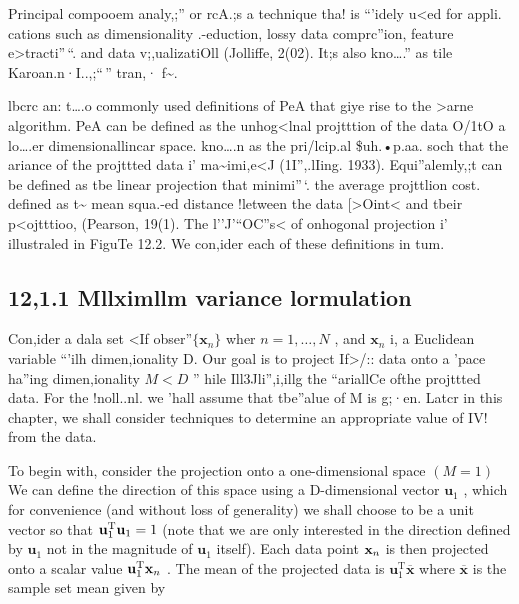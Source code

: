 \documentclass[
  10
]{article}
\begin{document}
Principal compooem analy,;'' or rcA.;s a technique tha! is ``'idely
u\textless ed for appli. cations such as dimensionality .-eduction,
lossy data comprc''ion, feature e\textgreater tracti''\,``. and data
v;,ualizatiOll (Jolliffe, 2(02). It;s also kno\ldots.'' as tile
Karoan.n·I..,;``\,'' tran,· f\textasciitilde.

lbcrc an: t\ldots.o commonly used definitions of PeA that giye rise to
the \textgreater arne algorithm. PeA can be defined as the
unhog\textless lnal projtttion of the data O/1tO a lo\ldots.er
dimensionallincar space. kno\ldots.n as the pri/lcip.al \$uh.•p.aa. soch
that the \textquotesingle ariance of the projttted data i'
ma\textasciitilde imi,e\textless J (1I'',.lIing. 1933). Equi''alemly,;t
can be defined as tbe linear projection that minimi''\,`. the average
projttlion cost. defined as t\textasciitilde{} mean squa.-ed distance
!letween the data {[}\textgreater Oint\textless{} and tbeir
p\textless ojtttioo, (Pearson, 19(1). The l''J'``OC''s\textless{} of
onhogonal projection i' illustraled in FiguTe 12.2. We con,ider each of
these definitions in tum.

\subsection{12,1.1 Mllximllm variance
lormulation}\label{mllximllm-variance-lormulation}

Con,ider a dala set \textless If
obser''\lations \(\{ \mathbf { x } _ { n } \}\) wher
\(n = 1 , \ldots , N\) , and \(\mathbf { x } _ { n }\) i, a Euclidean
variable ``'ilh dimen,ionality D. Our goal is to project
If\textgreater/:: data onto a 'pace ha''ing dimen,ionality \(M < D\) ''
hile Ill3Jli'',i,illg the ``ariallCe ofthe projttted data. For the
!noll..nl. we 'hall assume that tbe''alue of M is g;·en. Latcr in this
chapter, we shall consider techniques to determine an appropriate value
of IV! from the data.

To begin with, consider the projection onto a one-dimensional space
\(( M = 1 )\) We can define the direction of this space using a
D-dimensional vector \(\mathbf { u } _ { 1 }\) , which for convenience
(and without loss of generality) we shall choose to be a unit vector so
that \({ \bf u } _ { 1 } ^ { \mathrm { T } } { \bf u } _ { 1 } = 1\)
(note that we are only interested in the direction defined by
\(\mathbf { u } _ { 1 }\) not in the magnitude of
\(\mathbf { u } _ { 1 }\) itself). Each data point \({ \bf x } _ { n }\)
is then projected onto a scalar value
\({ \bf u } _ { 1 } ^ { \mathrm { T } } { \bf x } _ { n }\) . The mean
of the projected data is
\(\mathbf { u } _ { 1 } ^ { \mathrm { T } } \overline { { \mathbf { x } } }\)
where \(\overline { { \mathbf { x } } }\) is the sample set mean given
by
\end{document}
